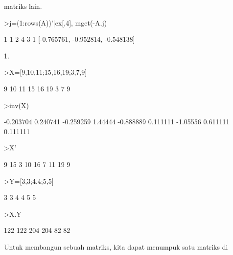 \documentclass[a4paper,10pt]{article}
\begin{document}
\begin{eulernotebook}
\begin{eulercomment}
\begin{eulercomment}
\begin{eulercomment}
\begin{eulercomment}
\begin{eulercomment}
\begin{eulercomment}
\begin{eulercomment}
\begin{eulercomment}
\begin{eulercomment}
matriks lain.
\end{eulercomment}
\begin{eulerprompt}
>j=(1:rows(A))'|ex[,4], mget(-A,j)
\end{eulerprompt}
\begin{euleroutput}
              1             1 
              2             4 
              3             1 
  [-0.765761,  -0.952814,  -0.548138]
\end{euleroutput}
\begin{eulercomment}
1.
\end{eulercomment}
\begin{eulerprompt}
>X=[9,10,11;15,16,19;3,7,9]
\end{eulerprompt}
\begin{euleroutput}
              9            10            11 
             15            16            19 
              3             7             9 
\end{euleroutput}
\begin{eulerprompt}
>inv(X)
\end{eulerprompt}
\begin{euleroutput}
      -0.203704      0.240741     -0.259259 
        1.44444     -0.888889      0.111111 
       -1.05556      0.611111      0.111111 
\end{euleroutput}
\begin{eulerprompt}
>X'
\end{eulerprompt}
\begin{euleroutput}
              9            15             3 
             10            16             7 
             11            19             9 
\end{euleroutput}
\begin{eulerprompt}
>Y=[3,3;4,4;5,5]
\end{eulerprompt}
\begin{euleroutput}
              3             3 
              4             4 
              5             5 
\end{euleroutput}
\begin{eulerprompt}
>X.Y
\end{eulerprompt}
\begin{euleroutput}
            122           122 
            204           204 
             82            82 
\end{euleroutput}
\begin{eulercomment}
Untuk membangun sebuah matriks, kita dapat menumpuk satu matriks di

\end{eulercomment}
\end{eulercomment}
\end{eulercomment}
\end{eulercomment}
\end{eulercomment}
\end{eulercomment}
\end{eulercomment}
\end{eulercomment}
\end{eulercomment}
\end{eulernotebook}
\end{document}
